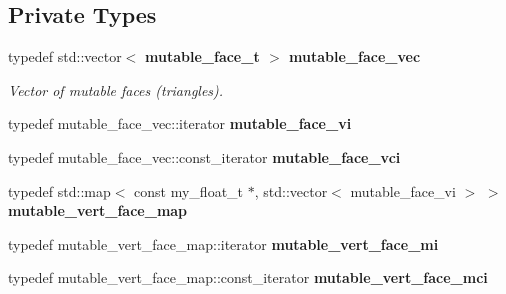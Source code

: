 \subsection*{Private Types}
\begin{CompactItemize}
\item 
typedef std::vector$<$ \bf{mutable\_\-face\_\-t} $>$ \bf{mutable\_\-face\_\-vec}\label{classASCbase_1_1geometry_1_1SimpleTrimeshTwo_820d124a6a7b91ebcec829990f741e39}

\begin{CompactList}\small\item\em Vector of mutable faces (triangles). \item\end{CompactList}\item 
typedef mutable\_\-face\_\-vec::iterator \textbf{mutable\_\-face\_\-vi}\label{classASCbase_1_1geometry_1_1SimpleTrimeshTwo_67e69e3a888c0c160c3f6ce71a68244d}

\item 
typedef mutable\_\-face\_\-vec::const\_\-iterator \textbf{mutable\_\-face\_\-vci}\label{classASCbase_1_1geometry_1_1SimpleTrimeshTwo_3940973197f37f724d808e3d50a24058}

\item 
typedef std::map$<$ const my\_\-float\_\-t $\ast$, std::vector$<$ mutable\_\-face\_\-vi $>$ $>$ \textbf{mutable\_\-vert\_\-face\_\-map}\label{classASCbase_1_1geometry_1_1SimpleTrimeshTwo_27881edcabffbac65061128ca312d097}

\item 
typedef mutable\_\-vert\_\-face\_\-map::iterator \textbf{mutable\_\-vert\_\-face\_\-mi}\label{classASCbase_1_1geometry_1_1SimpleTrimeshTwo_0d3a0a32929910b60583da6bd9445f85}

\item 
typedef mutable\_\-vert\_\-face\_\-map::const\_\-iterator \textbf{mutable\_\-vert\_\-face\_\-mci}\label{classASCbase_1_1geometry_1_1SimpleTrimeshTwo_1bab1411a23f6ed3b44f498bce0132a4}

\end{CompactItemize}
